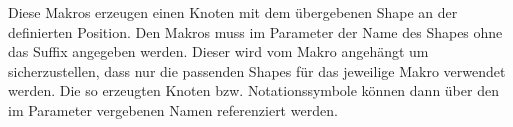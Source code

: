 \noindent\DescribeMacro{\memoprocess}\newline
\DescribeMacro{\memoevent}\newline
\DescribeMacro{\memoeventloaded}\newline
\DescribeMacro{\memoexception}\medskip

\noindent Diese Makros erzeugen einen Knoten mit dem übergebenen Shape an der definierten Position. Den Makros muss im Parameter  der Name des Shapes ohne das Suffix angegeben werden. Dieser wird vom Makro angehängt um sicherzustellen, dass nur die passenden Shapes für das jeweilige Makro verwendet werden. Die so erzeugten Knoten bzw. Notationssymbole können dann über den im Parameter  vergebenen Namen referenziert werden.

